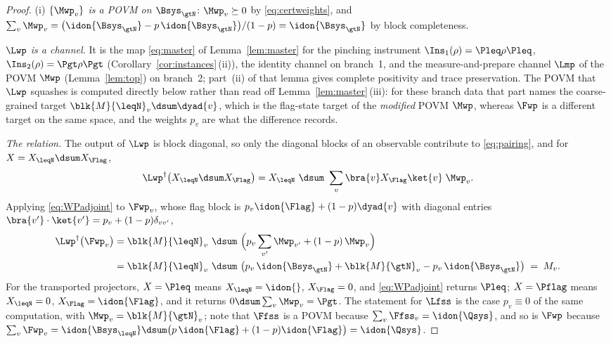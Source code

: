 \begin{proof}
(i) \emph{$\{\Mwp_v\}$ is a POVM on $\Bsys_{\gtN}$}: $\Mwp_v\succeq0$ by
\eqref{eq:certweights}, and
$\sum_v\Mwp_v=\big(\idon{\Bsys_{\gtN}}-p\,\idon{\Bsys_{\gtN}}\big)/(1-p)
=\idon{\Bsys_{\gtN}}$ by block completeness.

\emph{$\Lwp$ is a channel.} It is the map \eqref{eq:master} of
Lemma~\ref{lem:master} for the pinching instrument
$\Ins_1(\rho)=\Pleq\rho\Pleq$, $\Ins_2(\rho)=\Pgt\rho\Pgt$
(Corollary~\ref{cor:instances}\,(ii)), the identity channel on branch~1, and
the measure-and-prepare channel $\Lmp$ of the POVM $\Mwp$
(Lemma~\ref{lem:top}) on branch~2; part~(ii) of that lemma gives complete
positivity and trace preservation. The POVM that $\Lwp$ squashes is
computed directly below rather than read off
Lemma~\ref{lem:master}\,(iii): for these branch data that part names the
coarse-grained target $\blk{M}{\leqN}_v\dsum\dyad{v}$, which is the flag-state
target of the \emph{modified} POVM $\Mwp$, whereas $\Fwp$ is a different target
on the same space, and the weights $p_v$ are what the difference records.

\emph{The relation.} The output of $\Lwp$ is block
diagonal, so only the diagonal blocks of an observable contribute to
\eqref{eq:pairing}, and for $X=X_{\leqN}\dsum X_{\Flag}$,
\begin{equation}\label{eq:WPadjoint}
  \Lwp^{\dagger}\big(X_{\leqN}\dsum X_{\Flag}\big)
  = X_{\leqN}\ \dsum\ \sum_v\bra{v}X_{\Flag}\ket{v}\;\Mwp_v .
\end{equation}
Applying \eqref{eq:WPadjoint} to $\Fwp_v$, whose flag block is
$p_v\idon{\Flag}+(1-p)\dyad{v}$ with diagonal entries
$\bra{v'}\cdot\ket{v'}=p_v+(1-p)\delta_{vv'}$,
\begin{align*}
  \Lwp^{\dagger}\big(\Fwp_v\big)
  &= \blk{M}{\leqN}_v\ \dsum\
    \Big(p_v\sum_{v'}\Mwp_{v'}+(1-p)\,\Mwp_v\Big)\\
  &= \blk{M}{\leqN}_v\ \dsum\
    \big(p_v\,\idon{\Bsys_{\gtN}}+\blk{M}{\gtN}_v-p_v\,\idon{\Bsys_{\gtN}}\big)
  \;=\; M_v .
\end{align*}
For the transported projectors, $X=\Pleq$ means $X_{\leqN}=\idon{}$,
$X_{\Flag}=0$, and \eqref{eq:WPadjoint} returns $\Pleq$; $X=\Pflag$ means
$X_{\leqN}=0$, $X_{\Flag}=\idon{\Flag}$, and it returns
$0\dsum\sum_v\Mwp_v=\Pgt$. The statement for $\Lfss$ is the case
$p_v\equiv0$ of the same computation, with $\Mwp_v=\blk{M}{\gtN}_v$; note that
$\Ffss$ is a POVM because $\sum_v\Ffss_v=\idon{\Qsys}$, and so is $\Fwp$
because $\sum_v\Fwp_v=\idon{\Bsys_{\leqN}}\dsum
\big(p\,\idon{\Flag}+(1-p)\idon{\Flag}\big)=\idon{\Qsys}$.


\end{proof}
